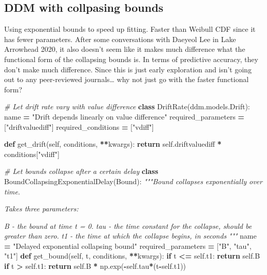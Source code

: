 \documentclass[
]{book}
\newenvironment{Shaded}{\begin{snugshade}}{\end{snugshade}}
\newcommand{\CommentTok}[1]{\textcolor[rgb]{0.56,0.35,0.01}{\textit{#1}}}
\newcommand{\ControlFlowTok}[1]{\textcolor[rgb]{0.13,0.29,0.53}{\textbf{#1}}}
\newcommand{\KeywordTok}[1]{\textcolor[rgb]{0.13,0.29,0.53}{\textbf{#1}}}
\newcommand{\NormalTok}[1]{#1}
\newcommand{\OperatorTok}[1]{\textcolor[rgb]{0.81,0.36,0.00}{\textbf{#1}}}
\newcommand{\StringTok}[1]{\textcolor[rgb]{0.31,0.60,0.02}{#1}}
\newcommand{\VariableTok}[1]{\textcolor[rgb]{0.00,0.00,0.00}{#1}}
\begin{document}
\hypertarget{ddm-with-collpasing-bounds}{%
\subsection{DDM with collpasing bounds}\label{ddm-with-collpasing-bounds}}

Using exponential bounds to speed up fitting. Faster than \citep{hawkins2015} Weibull CDF since it has fewer parameters. After some conversations with Daeyeol Lee in Lake Arrowhead 2020, it also doesn't seem like it makes much difference what the functional form of the collapsing bounds is. In terms of predictive accuracy, they don't make much difference. Since this is just early exploration and isn't going out to any peer-reviewed journals\ldots{} why not just go with the faster functional form?

\begin{Shaded}
\begin{Highlighting}[]
\CommentTok{\# Let drift rate vary with value difference}
\KeywordTok{class}\NormalTok{ DriftRate(ddm.models.Drift):}
\NormalTok{  name }\OperatorTok{=} \StringTok{"Drift depends linearly on value difference"}
\NormalTok{  required\_parameters }\OperatorTok{=}\NormalTok{ [}\StringTok{"driftvaluediff"}\NormalTok{]}
\NormalTok{  required\_conditions }\OperatorTok{=}\NormalTok{ [}\StringTok{"vdiff"}\NormalTok{]}
  
  \KeywordTok{def}\NormalTok{ get\_drift(}\VariableTok{self}\NormalTok{, conditions, }\OperatorTok{**}\NormalTok{kwargs):}
    \ControlFlowTok{return} \VariableTok{self}\NormalTok{.driftvaluediff }\OperatorTok{*}\NormalTok{ conditions[}\StringTok{"vdiff"}\NormalTok{]}
    
\CommentTok{\# Let bounds collapse after a certain delay}
\KeywordTok{class}\NormalTok{ BoundCollapsingExponentialDelay(Bound):}
    \CommentTok{"""Bound collapses exponentially over time.}

\CommentTok{    Takes three parameters: }

\CommentTok{    \textasciigrave{}B\textasciigrave{} {-} the bound at time t = 0.}
\CommentTok{    \textasciigrave{}tau\textasciigrave{} {-} the time constant for the collapse, should be greater than}
\CommentTok{    zero.}
\CommentTok{    \textasciigrave{}t1\textasciigrave{} {-} the time at which the collapse begins, in seconds}
\CommentTok{    """}
\NormalTok{    name }\OperatorTok{=} \StringTok{"Delayed exponential collapsing bound"}
\NormalTok{    required\_parameters }\OperatorTok{=}\NormalTok{ [}\StringTok{"B"}\NormalTok{, }\StringTok{"tau"}\NormalTok{, }\StringTok{"t1"}\NormalTok{]}
    \KeywordTok{def}\NormalTok{ get\_bound(}\VariableTok{self}\NormalTok{, t, conditions, }\OperatorTok{**}\NormalTok{kwargs):}
        \ControlFlowTok{if}\NormalTok{ t }\OperatorTok{\textless{}=} \VariableTok{self}\NormalTok{.t1:}
            \ControlFlowTok{return} \VariableTok{self}\NormalTok{.B}
        \ControlFlowTok{if}\NormalTok{ t }\OperatorTok{\textgreater{}} \VariableTok{self}\NormalTok{.t1:}
            \ControlFlowTok{return} \VariableTok{self}\NormalTok{.B }\OperatorTok{*}\NormalTok{ np.exp(}\OperatorTok{{-}}\VariableTok{self}\NormalTok{.tau}\OperatorTok{*}\NormalTok{(t}\OperatorTok{{-}}\VariableTok{self}\NormalTok{.t1))}


\end{Highlighting}
\end{Shaded}
\end{document}
